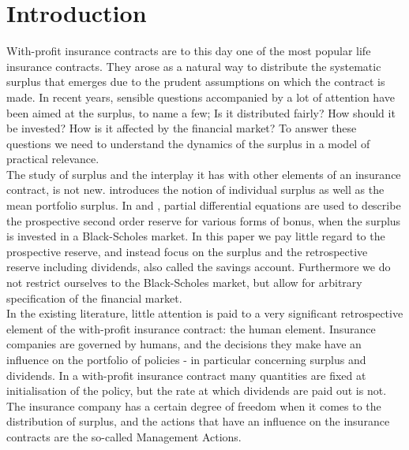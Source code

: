 \documentclass[12pt]{article}
\theoremstyle{my_thm}
\theoremstyle{my_rem}
\begin{document}
\section{Introduction}
With-profit insurance contracts are to this day one of the most popular life insurance contracts. They arose as a natural way to distribute the systematic surplus that emerges due to the prudent assumptions on which the contract is made. In recent years, sensible questions accompanied by a lot of attention have been aimed at the surplus, to name a few; Is it distributed fairly? How should it be invested? How is it affected by the financial market? To answer these questions we need to understand the dynamics of the surplus in a model of practical relevance.
\\[12pt]
The study of surplus and the interplay it has with other elements of an insurance contract, is not new. \citet{NorbergB} introduces the notion of individual surplus as well as the mean portfolio surplus. In \citet{Steffensen0} and \citet{Steffensen1}, partial differential equations are used to describe the prospective second order reserve for various forms of bonus, when the surplus is invested in a Black-Scholes market. In this paper we pay little regard to the prospective reserve, and instead focus on the surplus and the retrospective reserve including dividends, also called the savings account. Furthermore we do not restrict ourselves to the Black-Scholes market, but allow for arbitrary specification of the financial market.
\\[12pt]
In the existing literature, little attention is paid to a very significant retrospective element of the with-profit insurance contract: the human element. Insurance companies are governed by humans, and the decisions they make have an influence on the portfolio of policies - in particular concerning surplus and dividends. In a with-profit insurance contract many quantities are fixed at initialisation of the policy, but the rate at which dividends are paid out is not. The insurance company has a certain degree of freedom when it comes to the distribution of surplus, and the actions that have an influence on the insurance contracts are the so-called Management Actions.
\end{document}
